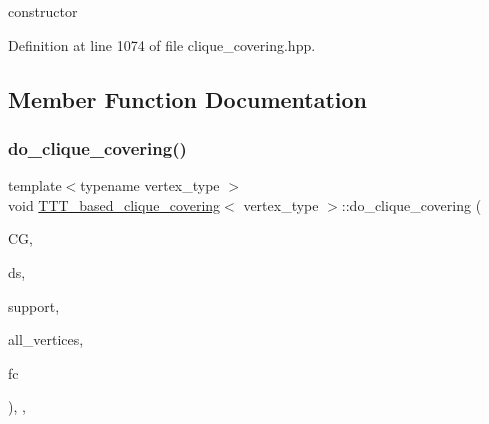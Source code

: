 constructor 



Definition at line 1074 of file clique\+\_\+covering.\+hpp.



\subsection{Member Function Documentation}
\mbox{\label{classTTT__based__clique__covering_af040c67cc904c1a462b3a5efe81a1689}} 
\subsubsection{\texorpdfstring{do\+\_\+clique\+\_\+covering()}{do\_clique\_covering()}}
{\footnotesize\ttfamily template$<$typename vertex\+\_\+type $>$ \\
void \hyperlink{classTTT__based__clique__covering}{T\+T\+T\+\_\+based\+\_\+clique\+\_\+covering}$<$ vertex\+\_\+type $>$\+::do\+\_\+clique\+\_\+covering (\begin{DoxyParamCaption}\item[{const \hyperlink{clique__covering__graph_8hpp_ac7a90ca8b64cfc536aaf17bc81186c18}{cc\+\_\+compatibility\+\_\+graph\+Ref}}]{CG,  }\item[{typename boost\+::disjoint\+\_\+sets$<$ \hyperlink{clique__covering__graph_8hpp_af170aff46b9e4328f1ad9b119cf78b4a}{rank\+\_\+pmap\+\_\+type}, \hyperlink{clique__covering__graph_8hpp_af4c454ac367cfb12e29c98e6bc942a06}{pred\+\_\+pmap\+\_\+type} $>$ \&}]{ds,  }\item[{\hyperlink{classCustomUnorderedSet}{Custom\+Unordered\+Set}$<$ \hyperlink{clique__covering__graph_8hpp_a9cb45047ea8c5ed95a8cfa90494345aa}{C\+\_\+vertex} $>$ \&}]{support,  }\item[{const \hyperlink{classCustomUnorderedSet}{Custom\+Unordered\+Set}$<$ \hyperlink{clique__covering__graph_8hpp_a9cb45047ea8c5ed95a8cfa90494345aa}{C\+\_\+vertex} $>$ \&}]{all\+\_\+vertices,  }\item[{const \hyperlink{structfilter__clique}{filter\+\_\+clique}$<$ vertex\+\_\+type $>$ \&}]{fc }\end{DoxyParamCaption})\hspace{0.3cm}{\ttfamily [inline]}, {\ttfamily [override]}, {\ttfamily [virtual]}}

